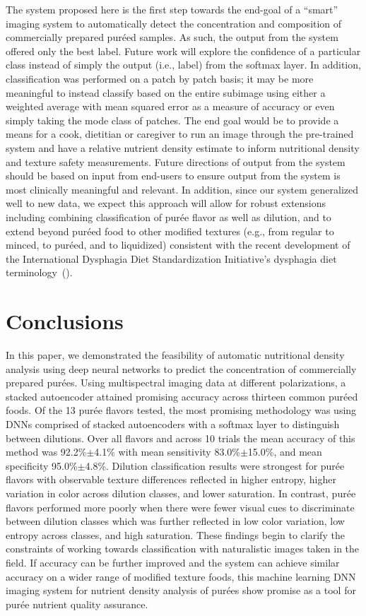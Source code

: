 \documentclass[authoryear]{elsarticle}
\begin{document}
The system proposed here is the first step towards the end-goal of a ``smart'' imaging system to automatically detect the concentration and composition of commercially prepared pur\' eed samples. As such, the output from the system offered only the best label. Future work will explore the confidence of a particular class instead of simply the output (i.e., label) from the softmax layer. In addition, classification was performed on a patch by patch basis; it may be more meaningful to instead classify based on the entire subimage using either a weighted average with mean squared error as a measure of accuracy or even simply taking the mode class of patches. The end goal would be to provide a means for a cook, dietitian or caregiver to run an image through the pre-trained system and have a relative nutrient density estimate to inform nutritional density and texture safety measurements. Future directions of output from the system should be based on input from end-users to ensure output from the system is most clinically meaningful and relevant. In addition, since our system generalized well to new data, we expect this approach will allow for robust extensions including combining classification of pur\' ee flavor as well as dilution, and to extend beyond pur\' eed food to other modified textures (e.g., from regular to minced, to pur\' eed, and to liquidized) consistent with the recent development of the International Dysphagia Diet Standardization Initiative's dysphagia diet terminology~(\cite{Cichero2016}).


\section{Conclusions}
\label{sec:Conclusions}
In this paper, we demonstrated the feasibility of automatic nutritional density analysis using deep neural networks to predict the concentration of commercially prepared pur\' ees. Using multispectral imaging data at different polarizations, a stacked autoencoder attained promising accuracy across thirteen common pur\' eed foods. Of the 13 pur\' ee flavors tested, the most promising methodology was using DNNs comprised of stacked autoencoders with a softmax layer to distinguish between dilutions. Over all flavors and across 10 trials the mean accuracy of this method was 92.2\%$\pm$4.1\% with mean sensitivity 83.0\%$\pm$15.0\%, and mean specificity 95.0\%$\pm$4.8\%. Dilution classification results were strongest for pur\' ee flavors with observable texture differences reflected in higher entropy, higher variation in color across dilution classes, and lower saturation. In contrast, pur\' ee flavors performed more poorly when there were fewer visual cues to discriminate between dilution classes which was further reflected in low color variation, low entropy across classes, and high saturation. These findings begin to clarify the constraints of working towards classification with naturalistic images taken in the field. If accuracy can be further improved and the system can achieve similar accuracy on a wider range of modified texture foods, this machine learning DNN imaging system for nutrient density analysis of pur\' ees show promise as a tool for pur\' ee nutrient quality assurance.
\end{document}
